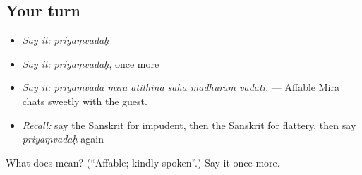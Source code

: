 \subsection*{Your turn}
\begin{itemize}
\raggedright
  \item \emph{Say it:} \emph{priyaṃvadaḥ}
  \item \emph{Say it:} \emph{priyaṃvadaḥ}, once more
  \item \emph{Say it:} \emph{priyaṃvadā mīrā atithinā saha madhuraṃ vadati.} — Affable Mira chats sweetly with the guest.
  \item \emph{Recall:} say the Sanskrit for impudent, then the Sanskrit for flattery, then say \emph{priyaṃvadaḥ} again
\end{itemize}

\begin{tcolorbox}[breakable,colback=teal!4,colframe=teal!35!black,title={Before you move on}]
What does  mean? (\textquotedblleft{}Affable; kindly spoken\textquotedblright{}.) Say it once more.
\end{tcolorbox}
